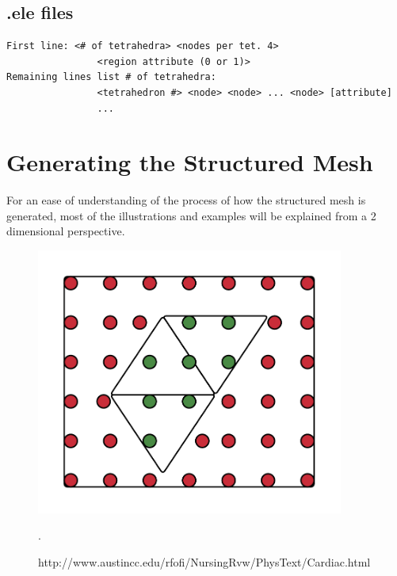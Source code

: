
\subsection{.ele files}
\begin{lstlisting}[caption=.ele file]
First line:	<# of tetrahedra> <nodes per tet. 4>
				<region attribute (0 or 1)>
Remaining lines list # of tetrahedra:
				<tetrahedron #> <node> <node> ... <node> [attribute]
				...
\end{lstlisting}

\section{Generating the Structured Mesh}
\label{generating_the structured_mesh}
For an ease of understanding of the process of how the structured mesh is generated, most of the illustrations and examples will be explained from a 2 dimensional perspective.

\begin{figure}[h]
 \centering 
     \includegraphics[width=0.9\textwidth]{bilder/m_points_inside}
     \caption{http://www.austincc.edu/rfofi/NursingRvw/PhysText/Cardiac.html}.
     \label{m_points_inside.png}
\end{figure}

